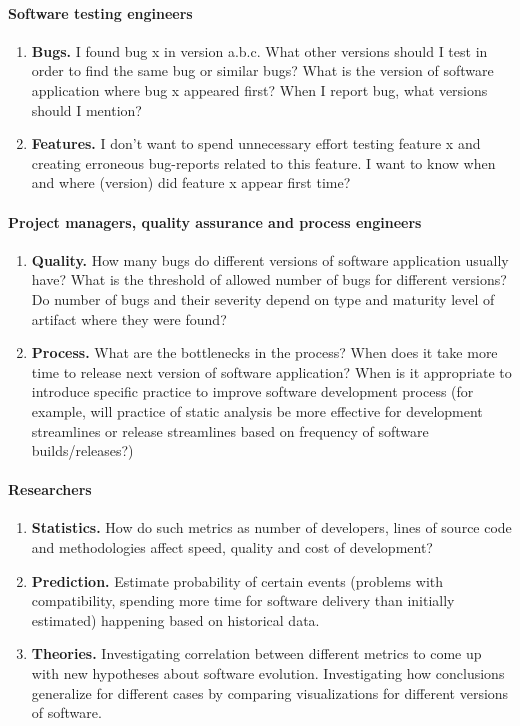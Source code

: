 \documentclass[journal]{vgtc}                %
\begin{document}
\paragraph{Software testing engineers}
	\begin{enumerate}
		\item \textbf{Bugs.} I found bug x in version a.b.c. What other versions should I test in order to find the same bug or similar bugs? What is the version of software application where bug x appeared first? When I report bug, what versions should I mention? 
		\item \textbf{Features.} I don’t want to spend unnecessary effort testing feature x and creating erroneous bug-reports related to this feature. I want to know when and where (version) did feature x appear first time?
	\end{enumerate}
	
\paragraph{Project managers, quality assurance and process engineers}
	\begin{enumerate}
		\item \textbf{Quality.} How many bugs do different versions of software application usually have? What is the threshold of allowed number of bugs for different versions? Do number of bugs and their severity depend on type and maturity level of artifact where they were found?
		\item \textbf{Process.} What are the bottlenecks in the process? When does it take more time to release next version of software application?  When is it appropriate to introduce specific practice to improve software development process (for example, will practice of static analysis be more effective for development streamlines or release streamlines based on frequency of software builds/releases?)
	\end{enumerate}

\paragraph{Researchers}
	\begin{enumerate}
		\item \textbf{Statistics.} How do such metrics as number of developers, lines of source code and methodologies affect speed, quality and cost of development? 
		\item \textbf{Prediction.} Estimate probability of certain events (problems with compatibility, spending more time for software delivery than initially estimated) happening based on historical data. 
		\item \textbf{Theories.} Investigating correlation between different metrics to come up with new hypotheses about software evolution. Investigating how conclusions generalize for different cases by comparing visualizations for different versions of software.
	\end{enumerate}
\end{document}
